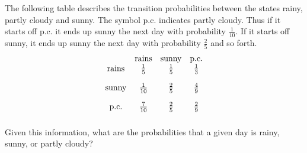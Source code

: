 \begin{enumialphparenastyle}
\begin{ex} The following table describes the transition probabilities between the
states rainy, partly cloudy and sunny. The symbol p.c. indicates partly
cloudy. Thus if it starts off p.c. it ends up sunny the next day with
probability $\frac{1}{10}$. If it starts off sunny, it ends up sunny the
next day with probability $\frac{2}{5}$ and so forth.
\begin{equation*}
\begin{array}{cccc}
& \text{rains} & \text{sunny} & \text{p.c.} \\
\text{rains} & \vspace{0.05in}\frac{1}{5} & \vspace{0.05in}\frac{1}{5} & \vspace{0.05in}\frac{1}{3} \\
\text{sunny} & \vspace{0.05in}\frac{1}{10} & \vspace{0.05in}\frac{2}{5} & \vspace{0.05in}\frac{4}{9} \\
\text{p.c.} & \vspace{0.05in}\frac{7}{10} & \vspace{0.05in}\frac{2}{5} & \vspace{0.05in}\frac{2}{9}
\end{array}
\end{equation*}
Given this information, what are the probabilities that a given day is
rainy, sunny, or partly cloudy?
\end{ex}


\end{enumialphparenastyle}
